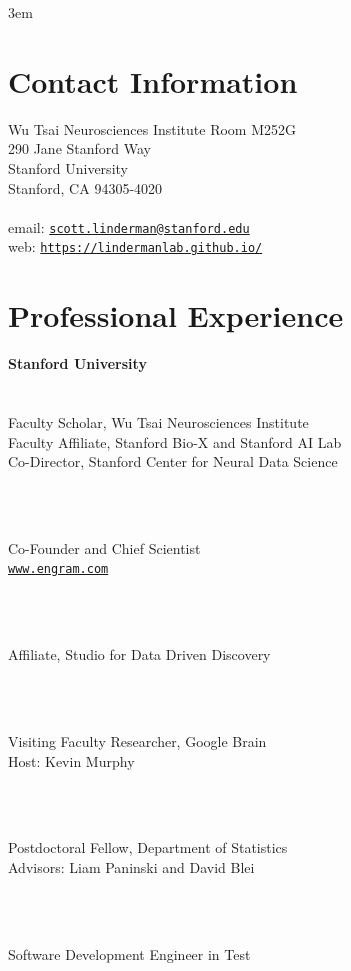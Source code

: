 \documentclass[10pt]{article}
\begin{document}
\emergencystretch 3em




\section{Contact Information}

Wu Tsai Neurosciences Institute Room M252G\\
290 Jane Stanford Way\\
Stanford University\\
Stanford, CA 94305-4020\\
\\
email: \href{mailto:scott.linderman@stanford.edu}{\nolinkurl{scott.linderman@stanford.edu}} \\
web: \href{https://lindermanlab.github.io}{\nolinkurl{https://lindermanlab.github.io/}}

\section{Professional Experience}
\parbox[t]{\textwidth}{%
  \textbf{Stanford University}\\
  \\
  \\
  Faculty Scholar, Wu Tsai Neurosciences Institute\\
  Faculty Affiliate, Stanford Bio-X and Stanford AI Lab\\
  Co-Director, Stanford Center for Neural Data Science\\
}
\\
\parbox[t]{\textwidth}{%
  \\
  Co-Founder and Chief Scientist\\
  \href{www.engram.com}{\nolinkurl{www.engram.com}}\\
}
\\
\parbox[t]{\textwidth}{%
  \\
  Affiliate, Studio for Data Driven Discovery\\
}
\\
\parbox[t]{\textwidth}{%
  \\
  Visiting Faculty Researcher, Google Brain\\
  Host: Kevin Murphy\\
}
\\
\parbox[t]{\textwidth}{%
  \\
  Postdoctoral Fellow, Department of Statistics\\
  Advisors: Liam Paninski and David Blei\\
}
\\
\parbox[t]{\textwidth}{%
  \\
  Software Development Engineer in Test\\
}
\end{document}
